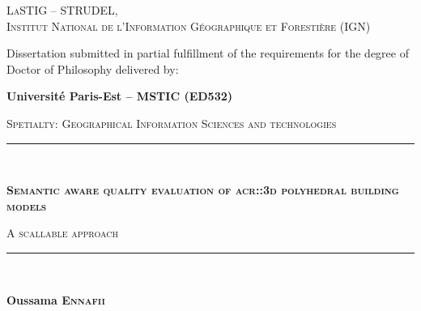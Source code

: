 \begin{titlepage}
    \begin{center}
        

        \vspace*{10mm}

        \begin{minipage}{.5\textwidth}
            \centering
            \textsc{LaSTIG -- STRUDEL,\\ Institut National de l'Information Géographique et Forestière (IGN)}
        \end{minipage}

        \vfill

        Dissertation submitted in partial fulfillment of the requirements for the degree of Doctor of Philosophy delivered by:

        \vspace*{5mm}

        \begin{Large}
            \textbf{Université Paris-Est -- MSTIC (ED532)}
        \end{Large}

        \vspace*{10mm}
        \begin{large}
            \textsc{Spetialty: Geographical Information Sciences and technologies}
        \end{large}
        \vspace*{10mm}

        \rule{\textwidth}{1.5pt}\\
        \begin{LARGE}
            \textsc{\textbf{Semantic aware quality evaluation of \acrshort*{acr::3d} polyhedral building models}}\\
        \end{LARGE}
        \vspace*{2.5mm}
        \begin{Large}
            \textsc{A scallable approach}
        \end{Large}
        \rule{\textwidth}{1.5pt}\\

        \vspace*{10mm}

        \begin{large}
            \textbf{Oussama \textsc{Ennafii}}
        \end{large}


\end{center}
\end{titlepage}
